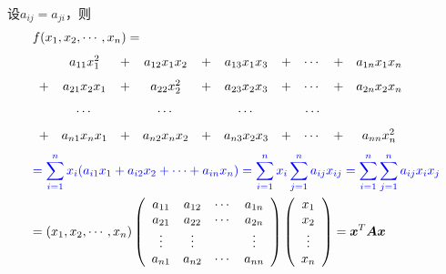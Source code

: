 \begin{frame}[allowframebreaks]
  设$a_{ij}=a_{ji}$，则
  $$
  \begin{array}{l}
    f(x_1,x_2,\cdots,x_n) =  \\[0.1in]
    \begin{array}{rcccccccccc}
      &a_{11}x_1^2&+&a_{12}x_1x_2&+&a_{13}x_1x_3&+&\cdots&+&a_{1n}x_1x_n\\[0.1in]
      +&a_{21}x_2x_1&+&a_{22}x_2^2&+&a_{23}x_2x_3&+&\cdots&+&a_{2n}x_2x_n\\[0.1in]
      &\cdots&&\cdots&&\cdots&&\cdots\\[0.1in]
      +&a_{n1}x_nx_1&+&a_{n2}x_nx_2&+&a_{n3}x_2x_3&+&\cdots&+&a_{nn}x_n^2
    \end{array} \\[0.5in] 
    \displaystyle
    \textcolor{blue}{= \sum_{i=1}^nx_i(a_{i1}x_1+a_{i2}x_2+\cdots+a_{in}x_n)
    = \sum_{i=1}^nx_i\sum_{j=1}^n a_{ij}x_{ij}
    = \sum_{i=1}^n\sum_{j=1}^na_{ij}x_ix_j}\\[0.2in] 
    \displaystyle = (x_1,x_2,\cdots,x_n)\left(
    \begin{array}{cccc}
      a_{11}&a_{12}&\cdots&a_{1n}\\
      a_{21}&a_{22}&\cdots&a_{2n}\\
      \vdots&\vdots&&\vdots\\
      a_{n1}&a_{n2}&\cdots&a_{nn}\\
    \end{array}
    \right)\left(
    \begin{array}{c}
      x_1\\
      x_2\\
      \vdots\\
      x_n
    \end{array}\right)  = {\boldsymbol{x}}^T\boldsymbol{A}{\boldsymbol{x}}
  \end{array}
  $$
  
\end{frame}


